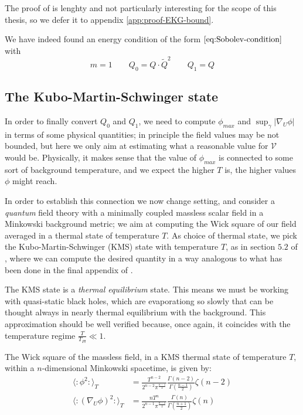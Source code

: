 The proof of is lenghty and not particularly interesting for the scope of this thesis, so we defer it to appendix \ref{app:proof-EKG-bound}.

We have indeed found an energy condition of the form \(\eqref{eq:Sobolev-condition}\) with 
\[
m = 1 \quad\quad Q_0 = Q\cdot\tilde{Q}^2 \quad\quad Q_1 = Q 
\]

\subsection{The Kubo-Martin-Schwinger state}

In order to finally convert \(Q_0\) and \(Q_1\), we need to compute \(\phi_{max}\) and \(\sup_{\gamma}\vert \nabla_U\phi\vert\) in terms of some physical quantities; in principle the field values may be not bounded, but here we only aim at estimating what a reasonable value for \(\mathcal{V}\) would be.
Physically, it makes sense that the value of \(\phi_{max}\) is connected to some sort of background temperature, and we expect the higher \(T\) is, the higher values \(\phi\) might reach.

In order to establish this connection we now change setting, and consider a \emph{quantum} field theory with a minimally coupled massless scalar field in a Minkowski background metric; we aim at computing the Wick square of our field averaged in a thermal state of temperature \(T\). As choice of thermal state, we pick the Kubo-Martin-Schwinger (KMS) state with temperature \(T\), as in section \(5.2\) of \cite{fewster2020new}, where we can compute the desired quantity in a way analogous to what has been done in the final appendix of \cite{brown2018singularity}.


\begin{remark}
	The KMS state is a \emph{thermal equilibrium} state. This means we must be working with quasi-static black holes, which are evaporationg so slowly that can be thought always in nearly thermal equilibrium with the background. This approximation should be well verified because, once again, it coincides with the temperature regime \(\frac{T}{T_{Pl}}\ll 1\).
\end{remark}

\begin{prop}
	\label{prop:wick-squares-KMS}
    The Wick square of the massless field, in a KMS thermal state of temperature \(T\), within a \(n\)-dimensional Minkowski spacetime, is given by:
    \begin{align*}
         \langle \colon \phi^2 \colon\rangle_T &= \frac{T^{n - 2}}{2^{n - 2}\pi^{\frac{n - 1}{2}}}\frac{\Gamma(n - 2)}{\Gamma\left(\frac{n - 1}{2}\right)}\zeta(n - 2) \\
        \langle \colon (\nabla_U\phi)^2 \colon\rangle_T &= \frac{nT^n}{2^{n - 1}\pi^{\frac{n - 1}{2}}} \frac{\Gamma(n)}{\Gamma\left(\frac{n + 1}{2}\right)} \zeta(n)
    \end{align*}

\end{prop}
    
